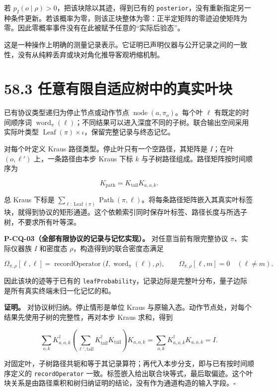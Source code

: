 \documentclass[
  11pt,
  oneside]{book}
\begin{document}
若 \(p_I(o\mid\rho)>0\)，把该块除以其迹，得到已有的
\texttt{posterior}，没有重新指定另一种条件更新。若该概率为零，则该正块整体为零：正半定矩阵的零迹迫使矩阵为零。因此零概率事件没有在此被赋予任意的``实际后验态''。

这是一种操作上明确的测量记录表示。它证明已声明仪器与公开记录之间的一致性，没有从纯粹丢弃或块对角化推导客观坍缩机制。

\section{58.3 任意有限自适应树中的真实叶块}

已有协议类型递归为停止节点或动作节点
\(\operatorname{node}(a,\pi_o)\)。每个叶 \(\ell\) 有既定的时间顺序词
\(\operatorname{word}_\pi(\ell)\)；不同结果可以进入深度不同的子树。联合输出空间采用实际叶类型
\(\operatorname{Leaf}(\pi)\times\iota\)，保留完整记录与终态记忆。

对每个叶定义 Kraus 路径类型。停止叶只有一个空路径，其矩阵是 \(I\)；在叶
\((o,\ell')\) 上，一条路径由本步 Kraus 下标 \(k\)
与子树路径组成。路径矩阵按时间顺序为

\[
K_{\text{path}}=K_{\text{tail}}K_{a,o,k}.
\]

总 Kraus 下标是
\(\sum_{\ell:\operatorname{Leaf}(\pi)}\operatorname{Path}(\pi,\ell)\)。将每条路径矩阵嵌入其真实叶标签块，就得到协议的矩形通道。这个依赖索引同时保存叶标签、路径长度与所选子树，不要求所有叶等深。

\protect\hypertarget{p-cq-03}{}{}

\textbf{P-CQ-03（全部有限协议的记录与记忆实现）。}
对任意当前有限完整协议 \(\pi\)、实际仪器族 \(I\) 和密度态
\(\rho\)，构造得到的联合密度态满足

\[
\Omega_{\pi,\rho}[\ell,\ell]
=\operatorname{recordOperator}\bigl(I,\operatorname{word}_\pi(\ell),\rho\bigr),
\qquad
\Omega_{\pi,\rho}[\ell,m]=0\quad(\ell\ne m).
\]

因此该块的迹等于已有的
\texttt{leaf\allowbreak Probability}，记录边际是完整叶分布，量子边际是所有真实终端未归一化记忆的和。

\textbf{证明。} 对协议树归纳。停止情形是单位 Kraus
与原输入态。动作节点处，对每个结果先使用子树的完整性，再对本步 Kraus
求和，得到

\[
\sum_{o,k}K_{a,o,k}^\dagger
\left(\sum_{\ell',\text{tail}}K_{\text{tail}}^\dagger K_{\text{tail}}\right)
K_{a,o,k}
=\sum_{o,k}K_{a,o,k}^\dagger K_{a,o,k}=I.
\]

对固定叶，子树路径共轭和等于其记录算符；再代入本步分支，即与已有按时间顺序定义的
\texttt{record\allowbreak Operator}
一致。标签嵌入给出联合块等式，最后取偏迹。这个叶块关系是由路径乘积和树归纳证明的结论，没有作为通道构造的输入字段。\(\square\)
\end{document}
